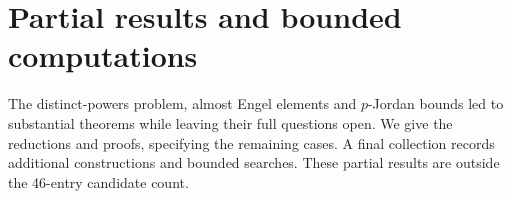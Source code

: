 \section{Partial results and bounded computations}
\label{app:partials}

The distinct-powers problem, almost Engel elements and \(p\)-Jordan
bounds led to substantial theorems while leaving their full questions
open. We give the reductions and proofs, specifying the remaining cases.
A final collection records additional constructions and bounded searches.
These partial results are outside the 46-entry candidate count.





